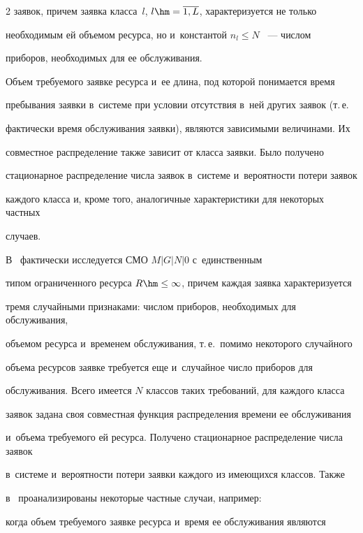 \begin{multicols}{2}
заявок, причем заявка класса~$l$, $l\hm=\overline{1,L}$, характеризуется не только 


необходимым ей объемом ресурса, но и~константой $n_l\leq N$ ~--- числом 


приборов, необходимых для ее обслуживания.


Объем требуемого заявке ресурса и~ее длина, под которой понимается время 


пребывания заявки в~сис\-те\-ме при условии отсутствия в~ней других заявок (т.\,е.\ 


фактически время обслуживания заявки), являются зависимыми величинами. Их 


совместное распределение также зависит от класса заявки. Было получено 


стационарное распределение числа заявок в~сис\-те\-ме и~вероятности потери заявок 


каждого класса и, кроме того,  аналогичные характеристики для некоторых частных 


случаев.


{





}





В~\cite{Tihonenko_26_2005} фактически исследуется СМО $M|G|N|0$ с~единственным 


типом ограниченного ресурса $R\hm\leq \infty$, причем каждая заявка характеризуется 


тремя случайными признаками: числом приборов, необходимых для обслуживания, 


объемом ресурса и~временем обслуживания, т.\,е.\ помимо некоторого случайного 


объема ресурсов заявке требуется еще и~случайное число приборов для 


обслуживания. Всего имеется $N$ классов таких требований, для каждого класса 


заявок задана своя совместная функция распределения времени ее обслуживания 


и~объема требуемого ей ресурса. Получено стационарное распределение числа заявок 


в~сис\-те\-ме и~вероятности потери заявки каждого из име\-ющих\-ся классов. Также 


в~\cite{Tihonenko_26_2005} проанализированы некоторые частные случаи, например: 


когда объем требуемого заявке ресурса и~время ее обслуживания являются 



\end{multicols}

